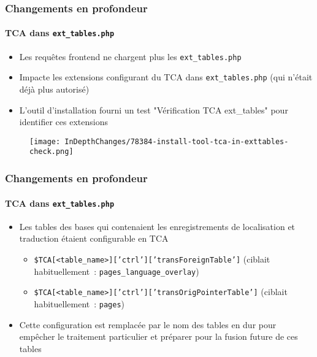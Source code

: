 \begin{frame}[fragile]
	\frametitle{Changements en profondeur}
	\framesubtitle{TCA dans \texttt{ext\_tables.php}}

	\begin{itemize}
		\item Les requêtes frontend ne chargent plus les \texttt{ext\_tables.php}
		\item Impacte les extensions configurant du TCA dans \texttt{ext\_tables.php}\newline
			\small(qui n'était déjà plus autorisé)\normalsize
		\item L'outil d'installation fourni un test "Vérification TCA ext\_tables" pour
			identifier ces extensions
	\end{itemize}

	\begin{figure}
		\texttt{[image: InDepthChanges/78384-install-tool-tca-in-exttables-check.png]}
	\end{figure}

\end{frame}
\begin{frame}[fragile]
	\frametitle{Changements en profondeur}
	\framesubtitle{TCA dans \texttt{ext\_tables.php}}

	\begin{itemize}
		\item Les tables des bases qui contenaient les enregistrements de localisation
			et traduction étaient configurable en TCA

			\begin{itemize}
				\item \texttt{\$TCA[<table\_name>]['ctrl']['transForeignTable']}\newline
					(ciblait habituellement~: \texttt{pages\_language\_overlay})
				\item \texttt{\$TCA[<table\_name>]['ctrl']['transOrigPointerTable']}\newline
					(ciblait habituellement~: \texttt{pages})
			\end{itemize}

		\item Cette configuration est remplacée par le nom des tables en dur pour
			empêcher le traitement particulier et préparer pour la fusion future
			de ces tables

	\end{itemize}

\end{frame}

